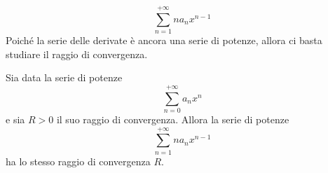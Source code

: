 \begin{equation*}
	\sum_{n=1}^{+\infty}na_nx^{n-1}
\end{equation*}
Poiché la serie delle derivate è ancora una serie di potenze, allora ci basta studiare il raggio di convergenza.
\begin{lemming}
	Sia data la serie di potenze 
	\begin{equation*}
		\sum_{n=0}^{+\infty}a_nx^n
	\end{equation*}
	e sia $R>0$ il suo raggio di convergenza. Allora la serie di potenze 
	\begin{equation*}
		\sum_{n=1}^{+\infty}na_nx^{n-1}
	\end{equation*}
	ha lo stesso raggio di convergenza $R$.
\end{lemming}

